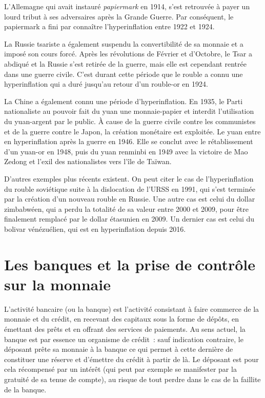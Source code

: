 \documentclass[a4paper,notitlepage]{article}
\newcommand{\eng}[1]{{\NoAutoSpaceBeforeFDP\emph{#1}}}  %
\begin{document}
L'Allemagne qui avait instauré \eng{papiermark} en 1914, s'est retrouvée à payer un lourd tribut à ses adversaires après la Grande Guerre. Par conséquent, le papiermark a fini par connaître l'hyperinflation entre 1922 et 1924.

La Russie tsariste a également suspendu la convertibilité de sa monnaie et a imposé son cours forcé. Après les révolutions de Février et d'Octobre, le Tsar a abdiqué et la Russie s'est retirée de la guerre, mais elle est cependant rentrée dans une guerre civile. C'est durant cette période que le rouble a connu une hyperinflation qui a duré jusqu'au retour d'un rouble-or en 1924.

La Chine a également connu une période d'hyperinflation. En 1935, le Parti nationaliste au pouvoir fait du yuan une monnaie-papier et interdit l'utilisation du yuan-argent par le public. À cause de la guerre civile contre les communistes et de la guerre contre le Japon, la création monétaire est exploitée. Le yuan entre en hyperinflation après la guerre en 1946. Elle se conclut avec le rétablissement d'un yuan-or en 1948, puis du yuan renminbi en 1949 avec la victoire de Mao Zedong et l'exil des nationalistes vers l'île de Taïwan.

D'autres exemples plus récents existent. On peut citer le cas de l'hyperinflation du rouble soviétique suite à la dislocation de l'URSS en 1991, qui s'est terminée par la création d'un nouveau rouble en Russie. Une autre cas est celui du dollar zimbabwéen, qui a perdu la totalité de sa valeur entre 2000 et 2009, pour être finalement remplacé par le dollar étasunien en 2009. Un dernier cas est celui du bolivar vénézuélien, qui est en hyperinflation depuis 2016.

\section{Les banques et la prise de contrôle sur la monnaie}

L'activité bancaire (ou la banque) est l'activité consistant à faire commerce de la monnaie et du crédit, en recevant des capitaux sous la forme de dépôts, en émettant des prêts et en offrant des services de paiements. Au sens actuel, la banque est par essence un organisme de crédit~: sauf indication contraire, le déposant prête sa monnaie à la banque ce qui permet à cette dernière de constituer une réserve et d'émettre du crédit à partir de là. Le déposant est pour cela récompensé par un intérêt (qui peut par exemple se manifester par la gratuité de sa tenue de compte), au risque de tout perdre dans le cas de la faillite de la banque.
\end{document}
